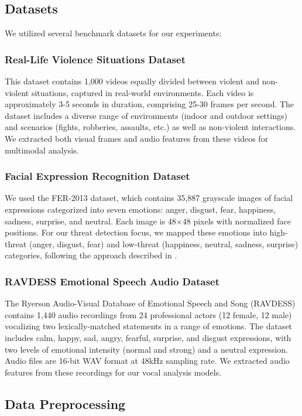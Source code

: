 \documentclass[conference,compsoc]{IEEEtran}
\begin{document}
\subsection{Datasets}
We utilized several benchmark datasets for our experiments:

\subsubsection{Real-Life Violence Situations Dataset}
This dataset contains 1,000 videos equally divided between violent and non-violent situations, captured in real-world environments. Each video is approximately 3-5 seconds in duration, comprising 25-30 frames per second. The dataset includes a diverse range of environments (indoor and outdoor settings) and scenarios (fights, robberies, assaults, etc.) as well as non-violent interactions. We extracted both visual frames and audio features from these videos for multimodal analysis.

\subsubsection{Facial Expression Recognition Dataset}
We used the FER-2013 dataset, which contains 35,887 grayscale images of facial expressions categorized into seven emotions: anger, disgust, fear, happiness, sadness, surprise, and neutral. Each image is 48×48 pixels with normalized face positions. For our threat detection focus, we mapped these emotions into high-threat (anger, disgust, fear) and low-threat (happiness, neutral, sadness, surprise) categories, following the approach described in \cite{nam2023}.

\subsubsection{RAVDESS Emotional Speech Audio Dataset}
The Ryerson Audio-Visual Database of Emotional Speech and Song (RAVDESS) contains 1,440 audio recordings from 24 professional actors (12 female, 12 male) vocalizing two lexically-matched statements in a range of emotions. The dataset includes calm, happy, sad, angry, fearful, surprise, and disgust expressions, with two levels of emotional intensity (normal and strong) and a neutral expression. Audio files are 16-bit WAV format at 48kHz sampling rate. We extracted audio features from these recordings for our vocal analysis models.

\subsection{Data Preprocessing}
\end{document}
